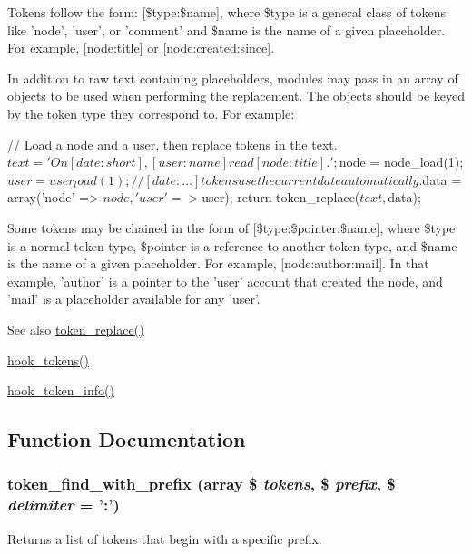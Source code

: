 Tokens follow the form: \mbox{[}\$type:\$name\mbox{]}, where \$type is a general class of tokens like 'node', 'user', or 'comment' and \$name is the name of a given placeholder. For example, \mbox{[}node:title\mbox{]} or \mbox{[}node:created:since\mbox{]}.

In addition to raw text containing placeholders, modules may pass in an array of objects to be used when performing the replacement. The objects should be keyed by the token type they correspond to. For example:


\begin{DoxyCode}
 // Load a node and a user, then replace tokens in the text.
 $text = 'On [date:short], [user:name] read [node:title].';
 $node = node_load(1);
 $user = user_load(1);

 // [date:...] tokens use the current date automatically.
 $data = array('node' => $node, 'user' => $user);
 return token_replace($text, $data);
\end{DoxyCode}


Some tokens may be chained in the form of \mbox{[}\$type:\$pointer:\$name\mbox{]}, where \$type is a normal token type, \$pointer is a reference to another token type, and \$name is the name of a given placeholder. For example, \mbox{[}node:author:mail\mbox{]}. In that example, 'author' is a pointer to the 'user' account that created the node, and 'mail' is a placeholder available for any 'user'.

\begin{DoxySeeAlso}{See also}
\hyperlink{includes_2token_8inc_a47eb294b05ca8d04439a9a82ccc4d82a}{token\_\-replace()} 

\hyperlink{group__hooks_ga3bfd87d9a19b2397b0f970e1cff7ea4f}{hook\_\-tokens()} 

\hyperlink{group__hooks_gab868597197cf36911f95dcd29ae0b954}{hook\_\-token\_\-info()} 
\end{DoxySeeAlso}


\subsection{Function Documentation}
\hypertarget{includes_2token_8inc_ae6241ad02cf636533b0a8304d2df4c1b}{
\subsubsection[{token\_\-find\_\-with\_\-prefix}]{\setlength{\rightskip}{0pt plus 5cm}token\_\-find\_\-with\_\-prefix (array \$ {\em tokens}, \/  \$ {\em prefix}, \/  \$ {\em delimiter} = {\ttfamily ':'})}}
\label{includes_2token_8inc_ae6241ad02cf636533b0a8304d2df4c1b}
Returns a list of tokens that begin with a specific prefix.


